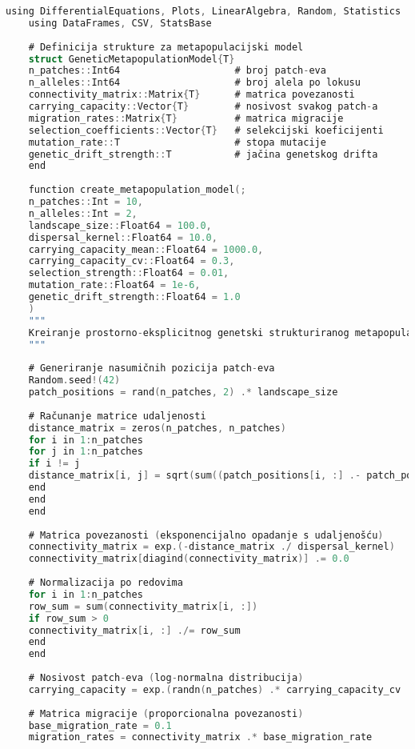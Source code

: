 \documentclass[11pt,oneside]{book}
\begin{document}
\begin{lstlisting}[language=C, caption=Julia implementacija genetski strukturiranog metapopulacijskog modela]
	using DifferentialEquations, Plots, LinearAlgebra, Random, Statistics
	using DataFrames, CSV, StatsBase
	
	# Definicija strukture za metapopulacijski model
	struct GeneticMetapopulationModel{T}
	n_patches::Int64                    # broj patch-eva
	n_alleles::Int64                    # broj alela po lokusu
	connectivity_matrix::Matrix{T}      # matrica povezanosti
	carrying_capacity::Vector{T}        # nosivost svakog patch-a
	migration_rates::Matrix{T}          # matrica migracije
	selection_coefficients::Vector{T}   # selekcijski koeficijenti
	mutation_rate::T                    # stopa mutacije
	genetic_drift_strength::T           # jačina genetskog drifta
	end
	
	function create_metapopulation_model(;
	n_patches::Int = 10,
	n_alleles::Int = 2,
	landscape_size::Float64 = 100.0,
	dispersal_kernel::Float64 = 10.0,
	carrying_capacity_mean::Float64 = 1000.0,
	carrying_capacity_cv::Float64 = 0.3,
	selection_strength::Float64 = 0.01,
	mutation_rate::Float64 = 1e-6,
	genetic_drift_strength::Float64 = 1.0
	)
	"""
	Kreiranje prostorno-eksplicitnog genetski strukturiranog metapopulacijskog modela
	"""
	
	# Generiranje nasumičnih pozicija patch-eva
	Random.seed!(42)
	patch_positions = rand(n_patches, 2) .* landscape_size
	
	# Računanje matrice udaljenosti
	distance_matrix = zeros(n_patches, n_patches)
	for i in 1:n_patches
	for j in 1:n_patches
	if i != j
	distance_matrix[i, j] = sqrt(sum((patch_positions[i, :] .- patch_positions[j, :]).^2))
	end
	end
	end
	
	# Matrica povezanosti (eksponencijalno opadanje s udaljenošću)
	connectivity_matrix = exp.(-distance_matrix ./ dispersal_kernel)
	connectivity_matrix[diagind(connectivity_matrix)] .= 0.0
	
	# Normalizacija po redovima
	for i in 1:n_patches
	row_sum = sum(connectivity_matrix[i, :])
	if row_sum > 0
	connectivity_matrix[i, :] ./= row_sum
	end
	end
	
	# Nosivost patch-eva (log-normalna distribucija)
	carrying_capacity = exp.(randn(n_patches) .* carrying_capacity_cv .+ log(carrying_capacity_mean))
	
	# Matrica migracije (proporcionalna povezanosti)
	base_migration_rate = 0.1
	migration_rates = connectivity_matrix .* base_migration_rate
	

\end{lstlisting}
\end{document}
